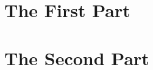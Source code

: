 \makeatletter
\renewcommand*\l@section{\@dottedtocline{1}{6.0em}{2.5em}}
\renewcommand*\l@subsection{\@dottedtocline{2}{9.0em}{3.0em}}
\makeatother





\clearpage
{}
\pagestyle{plain}




\part{\normalfont The First Part}\label{Part_One}





\part{\normalfont The Second Part}\label{Part_Two}





